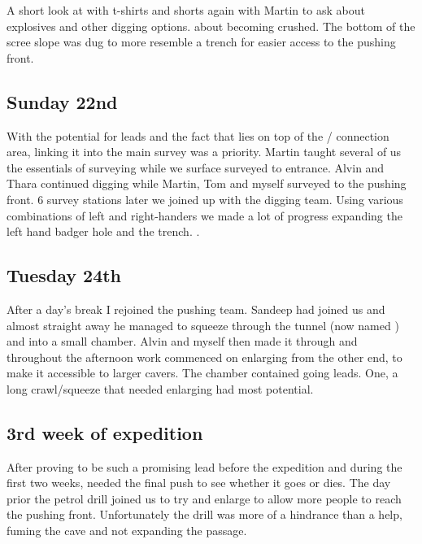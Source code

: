 A short look at  with t-shirts and shorts again with Martin to ask
about explosives and other digging options.  about becoming crushed. The
bottom of the scree slope was dug to more resemble a trench for easier
access to the pushing front.

\subsection{Sunday 22nd}

With the potential for leads and the fact that  lies on top of the
 /  connection area, linking it into the
main survey was a priority. Martin taught several of us the essentials
of surveying while we surface surveyed to  entrance. Alvin and Thara
continued digging while Martin, Tom and myself surveyed to the pushing
front. 6 survey stations later we joined up with the digging team. Using
various combinations of left and right-handers we made a lot of progress
expanding the left hand badger hole and the trench. .

\subsection{Tuesday 24th}

After a day's break I rejoined the  pushing team. Sandeep had joined
us and almost straight away he managed to squeeze through the tunnel
(now named ) and into a small chamber. Alvin and myself
then made it through and throughout the afternoon work commenced on
enlarging  from the other end, to make it accessible to
larger cavers. The chamber contained going leads. One, a long
crawl/squeeze that needed enlarging had most potential.

\subsection{3rd week of expedition}

After proving to be such a promising lead before the expedition and
during the first two weeks,  needed the final push to see
whether it goes or dies. The day prior the petrol drill joined us to try
and enlarge  to allow more people to reach the pushing
front. Unfortunately the drill was more of a hindrance than a help,
fuming the cave and not expanding the passage.

